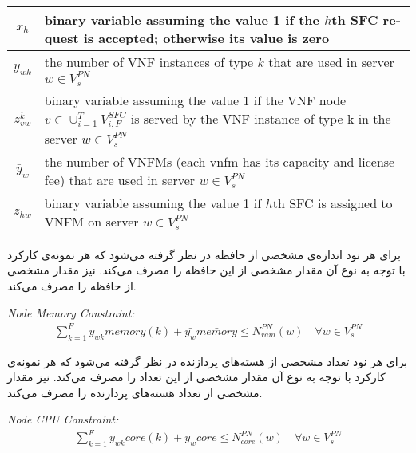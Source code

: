 \begin{center}\begin{latin}\begin{tabular}{|c|p{10cm}|}
    \hline
    \(x_h\) & binary variable assuming the value 1 if the \(h\)th SFC request is accepted; otherwise its value is zero \\
    \hline
    \(y_{wk}\) & the number of VNF instances of type \(k\) that are used in server \(w \in V_s^{PN}\) \\
    \hline
    \(z^k_{vw}\) & binary variable assuming the value 1 if the VNF node \(v \in \cup_{i=1}^{T} V_{i, F}^{SFC}\) is served by the VNF instance of type k in the server \(w \in V_s^{PN}\) \\
    \hline
    \(\bar{y}_w\) & the number of VNFMs (each vnfm has its capacity and license fee) that are used in server \(w \in V_s^{PN} \) \\
    \hline
    \(\bar{z}_{hw}\) & binary variable assuming the value 1 if \(h\)th SFC is assigned to VNFM on server \(w \in V_s^{PN}\) \\
    \hline
\end{tabular}\end{latin}\end{center}

برای هر نود اندازه‌ی مشخصی از حافظه 
در نظر گرفته می‌شود که هر نمونه‌ی کارکرد با توجه به نوع آن مقدار مشخصی از این حافظه را مصرف می‌کند.
 نیز مقدار مشخصی از حافظه را مصرف می‌کند.

\begin{latin}
    \textit{Node Memory Constraint:}
    \begin{align}
        \sum_{k=1}^F y_{wk} memory(k) + \bar{y_w} \bar{memory} \le N_{ram}^{PN}(w)
        \quad
        \forall w \in V_s^{PN}
    \end{align}
\end{latin}

برای هر نود تعداد مشخصی از هسته‌های پردازنده در نظر گرفته می‌شود که هر نمونه‌ی کارکرد با توجه به نوع آن مقدار مشخصی از این تعداد را مصرف می‌کند.
 نیز مقدار مشخصی از تعداد هسته‌های پردازنده را مصرف می‌کند.

\begin{latin}
    \textit{Node CPU Constraint:}
    \begin{align}
        \sum_{k=1}^F y_{wk} core(k) + \bar{y_w} \bar{core} \le N_{core}^{PN}(w)
        \quad
        \forall w \in V_s^{PN}
    \end{align}
\end{latin}

